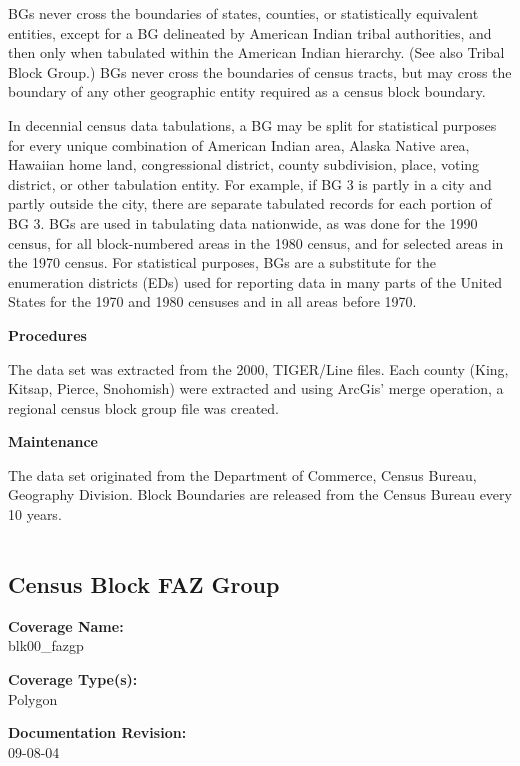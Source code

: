 BGs never cross the boundaries of states, counties, or
statistically equivalent entities, except for a BG delineated by
American Indian tribal authorities, and then only when tabulated
within the American Indian hierarchy. (See also Tribal Block
Group.) BGs never cross the boundaries of census tracts, but may
cross the boundary of any other geographic entity required as a
census block boundary.

In decennial census data tabulations, a BG may be split for
statistical purposes for every unique combination of American
Indian area, Alaska Native area, Hawaiian home land, congressional
district, county subdivision, place, voting district, or other
tabulation entity. For example, if BG 3 is partly in a city and
partly outside the city, there are separate tabulated records for
each portion of BG 3. BGs are used in tabulating data nationwide,
as was done for the 1990 census, for all block-numbered areas in
the 1980 census, and for selected areas in the 1970 census. For
statistical purposes, BGs are a substitute for the enumeration
districts (EDs) used for reporting data in many parts of the
United States for the 1970 and 1980 censuses and in all areas
before 1970.

{\bf \large Procedures}

The data set was extracted from the 2000, TIGER/Line files. Each
county (King, Kitsap, Pierce, Snohomish) were extracted and using
ArcGis' merge operation, a regional census block group file was
created.

{\bf \large Maintenance}

The data set originated from the Department of Commerce, Census
Bureau, Geography Division. Block Boundaries are released from the
Census Bureau every 10 years.

\begin{landscape}
\begin{longtable}{llrrrrrc}

\end{longtable}
\end{landscape}
\newpage

\subsection{Census Block FAZ Group}
{\bf \large Coverage Name:}\\
blk00\_fazgp

{\bf \large Coverage Type(s):}\\
Polygon

{\bf \large Documentation Revision:}\\
09-08-04

